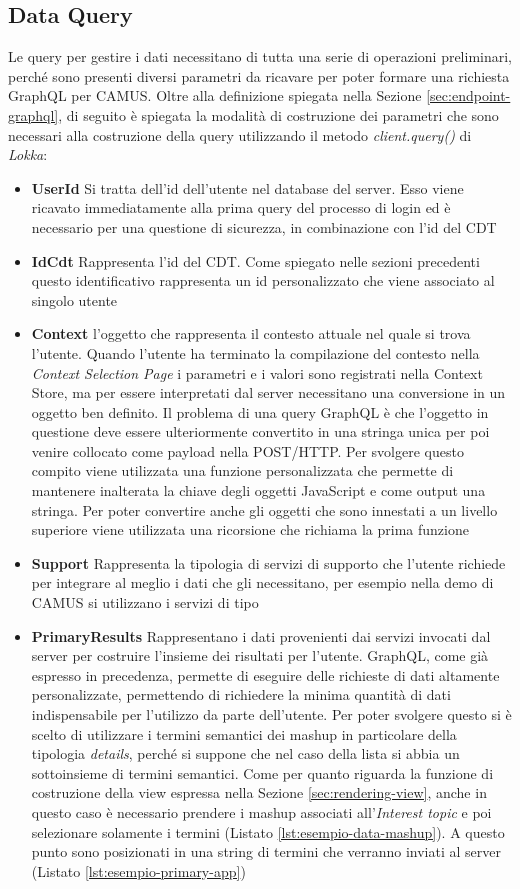 \subsection{Data Query} \label{sec:data-query}
Le query per gestire i dati necessitano di tutta una serie di operazioni preliminari, perché sono presenti diversi parametri da ricavare per poter formare una richiesta GraphQL per CAMUS. Oltre alla definizione spiegata nella Sezione \ref{sec:endpoint-graphql}, di seguito è spiegata la modalità di costruzione dei parametri che sono necessari alla costruzione della query utilizzando il metodo \emph{client.query()} di \emph{Lokka}:
\begin{itemize}
	\item \textbf{UserId} Si tratta dell'id dell'utente nel database del server. Esso viene ricavato immediatamente alla prima query del processo di login ed è necessario per una questione di sicurezza, in combinazione con l'id del CDT
	\item \textbf{IdCdt} Rappresenta l'id del CDT. Come spiegato nelle sezioni precedenti questo identificativo rappresenta un id personalizzato che viene associato al singolo utente
	\item \textbf{Context} \upe l'oggetto che rappresenta il contesto attuale nel quale si trova l'utente. Quando l'utente ha terminato la compilazione del contesto nella \emph{Context Selection Page} i parametri e i valori sono registrati nella Context Store, ma per essere interpretati dal server necessitano una conversione in un oggetto ben definito. Il problema di una query GraphQL è che l'oggetto in questione deve essere ulteriormente convertito in una stringa unica per poi venire collocato come payload nella POST/HTTP. Per svolgere questo compito viene utilizzata una funzione personalizzata che permette di mantenere inalterata la chiave degli oggetti JavaScript e come output una stringa. Per poter convertire anche gli oggetti che sono innestati a un livello superiore viene utilizzata una ricorsione che richiama la prima funzione
	\item \textbf{Support} Rappresenta la tipologia di servizi di supporto che l'utente richiede per integrare al meglio i dati che gli necessitano, per esempio nella demo di CAMUS si utilizzano i servizi di tipo 
	\item \textbf{PrimaryResults} Rappresentano i dati provenienti dai servizi invocati dal server per costruire l'insieme dei risultati per l'utente. GraphQL, come già espresso in precedenza, permette di eseguire delle richieste di dati altamente personalizzate, permettendo di richiedere la minima quantità di dati indispensabile per l'utilizzo da parte dell'utente. Per poter svolgere questo si è scelto di utilizzare i termini semantici dei mashup in particolare della tipologia \emph{details}, perché si suppone che nel caso della lista si abbia un sottoinsieme di termini semantici. Come per quanto riguarda la funzione di costruzione della view espressa nella Sezione \ref{sec:rendering-view}, anche in questo caso è necessario prendere i mashup associati all'\emph{Interest topic} e poi selezionare solamente i termini (Listato \ref{lst:esempio-data-mashup}). A questo punto sono posizionati in una string di termini che verranno inviati al server (Listato \ref{lst:esempio-primary-app})

\end{itemize}
